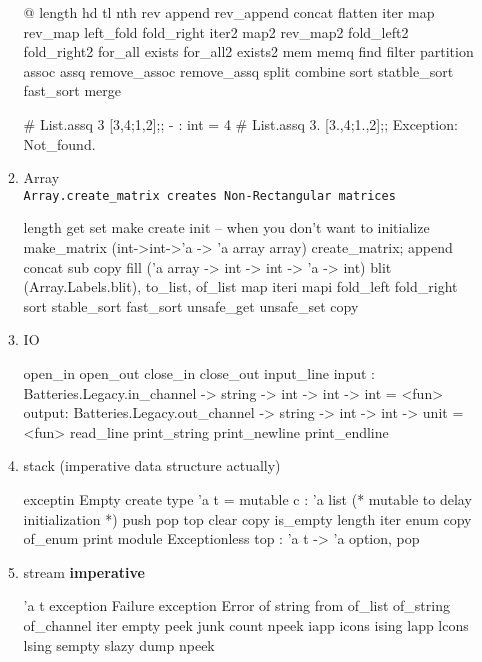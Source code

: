\begin{enumerate}
\begin{enumerate}
\begin{ocamlcode}
      @ length hd tl nth rev append rev_append concat flatten
      iter map rev_map left_fold fold_right iter2 map2 rev_map2
      fold_left2 fold_right2 for_all exists for_all2 exists2 
      mem memq find filter partition assoc assq remove_assoc remove_assq
      split combine sort statble_sort fast_sort merge
    \end{ocamlcode}

\begin{alternate}    
# List.assq 3 [3,4;1,2];;
- : int = 4
# List.assq 3. [3.,4;1.,2];;
Exception: Not_found.
\end{alternate}

    \item Array \\
      \verb|Array.create_matrix creates Non-Rectangular matrices|

\begin{ocamlcode}
length get set make create init -- when you don't want to initialize
make_matrix (int->int->'a -> 'a array array) create_matrix;
append concat sub copy fill ('a array -> int -> int -> 'a -> int)
blit (Array.Labels.blit), to_list, of_list map iteri mapi fold_left
fold_right sort stable_sort fast_sort unsafe_get unsafe_set copy
\end{ocamlcode}

    \item IO \\

\begin{ocamlcode}
open_in open_out close_in close_out input_line
input : Batteries.Legacy.in_channel -> string -> int -> int -> int = <fun> 
output: Batteries.Legacy.out_channel -> string -> int -> int -> unit =<fun> 
read_line print_string print_newline print_endline
\end{ocamlcode}

    \item stack (imperative data structure actually)

\begin{ocamlcode}
exceptin Empty
create
type 'a t = { mutable c : 'a list }
(* mutable to delay initialization *)
push pop top clear copy is_empty length iter enum copy
of_enum print
module Exceptionless
  top : 'a t -> 'a option, pop
\end{ocamlcode}

    \item stream \textbf{imperative}

\begin{ocamlcode}
'a t
exception Failure
exception Error of string
from
of_list of_string of_channel iter empty peek junk count npeek
iapp icons ising lapp lcons lsing
sempty slazy dump npeek
\end{ocamlcode}


\end{enumerate}
\end{enumerate}
